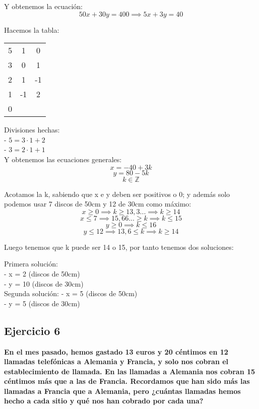 \documentclass[11pt, a4paper, titlepage]{article}
\providecommand{\ent}{\mathbb{Z}}
\begin{document}
Y obtenemos la ecuación:
$$ 50x + 30y = 400 \implies 5x + 3y = 40 $$

Hacemos la tabla:

\begin{center}
\begin{tabular}{c|cc}
5 & 1 & 0 \\
3 & 0 & 1 \\
\hline
2 & 1 & -1 \\
\hline
1 & -1 & 2 \\
\hline
0
\end{tabular}
\end{center}

Divisiones hechas: \\
- $ 5 = 3 \cdot 1 + 2 $ \\
- $ 3 = 2 \cdot 1 + 1 $ \\

Y obtenemos las ecuaciones generales:
$$ x = -40 + 3k $$
$$ y = 80 - 5k $$ 
$$ k \in \ent $$

Acotamos la k, sabiendo que x e y deben ser positivos o 0; y además solo podemos usar 7 discos de 50cm y 12 de 30cm como máximo:
$$ x \geq 0 \implies k \geq 13,3... \implies k \geq 14 $$
$$ x \leq 7 \implies 15,66... \geq k \implies k \leq 15 $$
$$ y \geq 0 \implies k \leq 16 $$
$$ y \leq 12 \implies 13,6 \leq k \implies k \geq 14 $$

Luego tenemos que k puede ser 14 o 15, por tanto tenemos dos soluciones:

Primera solución: \\
- x = 2 (discos de 50cm) \\
- y = 10 (discos de 30cm) \\

Segunda solución:
- x = 5 (discos de 50cm) \\
- y = 5 (discos de 30cm) \\

\subsection{\LARGE{Ejercicio 6}}

\textbf{En el mes pasado, hemos gastado 13 euros y 20 céntimos en 12 llamadas
telefónicas a Alemania y Francia, y solo nos cobran el establecimiento de llamada.
En las llamadas a Alemania nos cobran 15 céntimos más que a las de Francia.
Recordamos que han sido más las llamadas a Francia que a Alemania, pero ¿cuántas
llamadas hemos hecho a cada sitio y qué nos han cobrado por cada una?}
\end{document}
